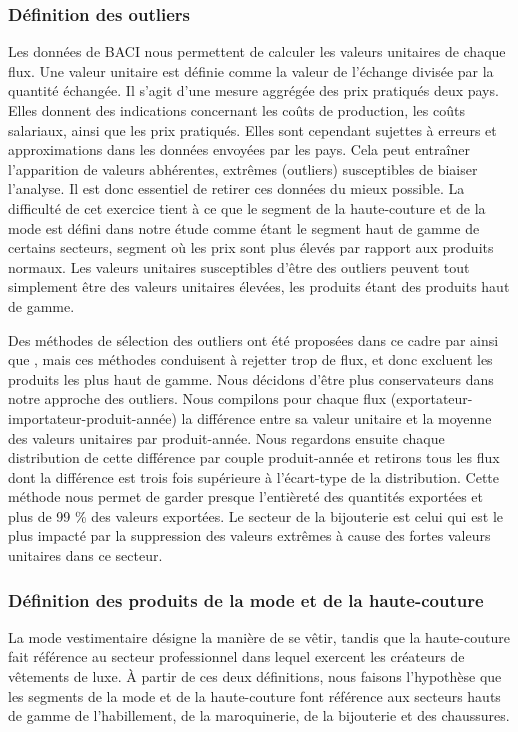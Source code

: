 \documentclass[french,10pt,a4paper]{article}
\begin{document}
\subsubsection*{Définition des outliers}
Les données de BACI nous permettent de calculer les valeurs unitaires de chaque flux. Une valeur unitaire est définie comme la valeur de l'échange divisée par la quantité échangée. Il s'agit d'une mesure aggrégée des prix pratiqués deux pays. Elles donnent des indications concernant les coûts de production, les coûts salariaux, ainsi que les prix pratiqués. Elles sont cependant sujettes à erreurs et approximations dans les données envoyées par les pays. Cela peut entraîner l'apparition de valeurs abhérentes, extrêmes (outliers) susceptibles de biaiser l'analyse. Il est donc essentiel de retirer ces données du mieux possible. La difficulté de cet exercice tient à ce que le segment de la haute-couture et de la mode est défini dans notre étude comme étant le segment haut de gamme de certains secteurs, segment où les prix sont plus élevés par rapport aux produits normaux. Les valeurs unitaires susceptibles d'être des outliers peuvent tout simplement être des valeurs unitaires élevées, les produits étant des produits haut de gamme.

Des méthodes de sélection des outliers ont été proposées dans ce cadre par \cite{Hallak2006} ainsi que \cite{Fontagne2013}, mais ces méthodes conduisent à rejetter trop de flux, et donc excluent les produits les plus haut de gamme. Nous décidons d'être plus conservateurs dans notre approche des outliers. Nous compilons pour chaque flux (exportateur-importateur-produit-année) la différence entre sa valeur unitaire et la moyenne des valeurs unitaires par produit-année. Nous regardons ensuite chaque distribution de cette différence par couple produit-année et retirons tous les flux dont la différence est trois fois supérieure à l'écart-type de la distribution. Cette méthode nous permet de garder presque l'entièreté des quantités exportées et plus de 99 \% des valeurs exportées. Le secteur de la bijouterie est celui qui est le plus impacté par la suppression des valeurs extrêmes à cause des fortes valeurs unitaires dans ce secteur.

\subsubsection*{Définition des produits de la mode et de la haute-couture}
La mode vestimentaire désigne la manière de se vêtir, tandis que la haute-couture fait référence au secteur professionnel dans lequel exercent les créateurs de vêtements de luxe. À partir de ces deux définitions, nous faisons l'hypothèse que les segments de la mode et de la haute-couture font référence aux secteurs hauts de gamme de l'habillement, de la maroquinerie, de la bijouterie et des chaussures.
\end{document}
